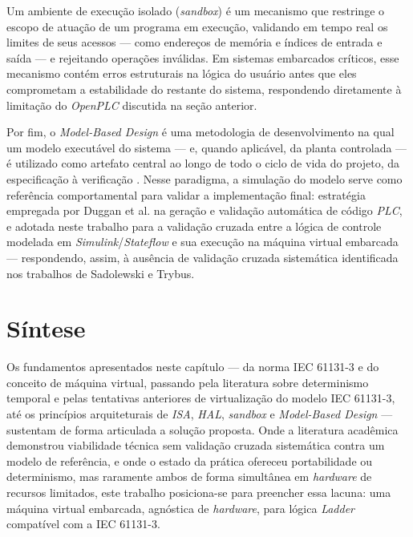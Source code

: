 Um ambiente de execução isolado (\textit{sandbox}) é um mecanismo que restringe o escopo de atuação de um programa em execução, validando em tempo real os limites de seus acessos --- como endereços de memória e índices de entrada e saída --- e rejeitando operações inválidas.
Em sistemas embarcados críticos, esse mecanismo contém erros estruturais na lógica do usuário antes que eles comprometam a estabilidade do restante do sistema, respondendo diretamente à limitação do \textit{OpenPLC} discutida na seção anterior.

Por fim, o \textit{Model-Based Design} é uma metodologia de desenvolvimento na qual um modelo executável do sistema --- e, quando aplicável, da planta controlada --- é utilizado como artefato central ao longo de todo o ciclo de vida do projeto, da especificação à verificação \cite{nicolescu:2009}.
Nesse paradigma, a simulação do modelo serve como referência comportamental para validar a implementação final: estratégia empregada por Duggan et al. \cite{duggan:2022} na geração e validação automática de código \textit{PLC}, e adotada neste trabalho para a validação cruzada entre a lógica de controle modelada em \textit{Simulink}/\textit{Stateflow} e sua execução na máquina virtual embarcada --- respondendo, assim, à ausência de validação cruzada sistemática identificada nos trabalhos de Sadolewski e Trybus.


\section{Síntese}
\label{sec:sintese-fundamentacao}

Os fundamentos apresentados neste capítulo --- da norma IEC 61131-3 e do conceito de máquina virtual, passando pela literatura sobre determinismo temporal e pelas tentativas anteriores de virtualização do modelo IEC 61131-3, até os princípios arquiteturais de \textit{ISA}, \textit{HAL}, \textit{sandbox} e \textit{Model-Based Design} --- sustentam de forma articulada a solução proposta.
Onde a literatura acadêmica demonstrou viabilidade técnica sem validação cruzada sistemática contra um modelo de referência, e onde o estado da prática ofereceu portabilidade ou determinismo, mas raramente ambos de forma simultânea em \textit{hardware} de recursos limitados, este trabalho posiciona-se para preencher essa lacuna: uma máquina virtual embarcada, agnóstica de \textit{hardware}, para lógica \textit{Ladder} compatível com a IEC 61131-3.

